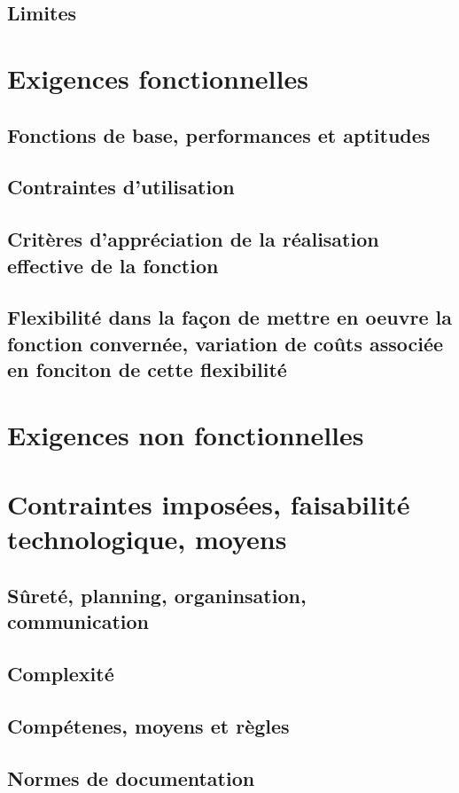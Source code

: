 \subsection{Limites}

\section{Exigences fonctionnelles}
\subsection{Fonctions de base, performances et aptitudes}
\subsection{Contraintes d'utilisation}
\subsection{Critères d'appréciation de la réalisation effective de la fonction}
\subsection{Flexibilité dans la façon de mettre en oeuvre la fonction convernée, variation de coûts associée en fonciton de cette flexibilité}

\section{Exigences non fonctionnelles}

\section{Contraintes imposées, faisabilité technologique, moyens}
\subsection{Sûreté, planning, organinsation, communication}
\subsection{Complexité}
\subsection{Compétenes, moyens et règles}
\subsection{Normes de documentation}

